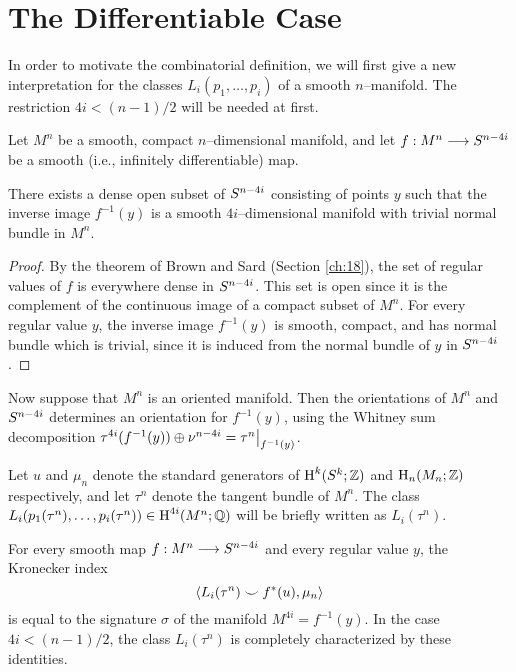 \documentclass[../main]{subfiles}
\begin{document}
\section{The Differentiable Case}
In order to motivate the combinatorial definition, we will first give a new interpretation for the classes $L_i(p_1, \ldots, p_i)$ of a smooth $n$--manifold. The restriction $4i < (n - 1)/2$ will be needed at first.

Let $M^n$ be a smooth, compact $n$--dimensional manifold, and let \newline $f : M^n \longrightarrow S^{n - 4i}$ be a smooth (i.e., infinitely differentiable) map. 

\begin{lemma}
There exists a dense open subset of $S^{n - 4i}$ consisting of points $y$ such that the inverse image $f^{-1}(y)$ is a smooth $4i$--dimensional manifold with trivial normal bundle in $M^n$. 
\end{lemma}

\begin{proof}
By the theorem of Brown and Sard (Section \ref{ch:18}), the set of regular values of $f$ is everywhere dense in $S^{n - 4i}$. This set is open since it is the complement of the continuous image of a compact subset of $M^n$. For every regular value $y$, the inverse image $f^{-1}(y)$ is smooth, compact, and has normal bundle which is trivial, since it is induced from the normal bundle of $y$ in $S^{n - 4i}$.  
\end{proof}

Now suppose that $M^n$ is an oriented manifold. Then the orientations of $M^n$ and $S^{n - 4i}$ determines an orientation for $f^{-1}(y)$, using the Whitney sum decomposition $\tau^{4i}(f^{-1}(y)) \oplus \nu^{n - 4i} = \tau^n \big{|}_{f^{-1}(y)}$.

Let $u$ and $\mu_n$ denote the standard generators of $\operatorname{H}^k(S^k; \mathbb Z)$ and $\operatorname{H}_n(M_n; \mathbb Z)$ respectively, and let $\tau^n$ denote the tangent bundle of $M^n$. The class \newline $L_i(p_1(\tau^n), \ldots, p_i(\tau^n)) \in \operatorname{H}^{4i}(M^n; \mathbb Q)$ will be briefly written as $L_i(\tau^n)$. 

\begin{lemma}
\label{lem:20.2}
For every smooth map $f : M^n \longrightarrow S^{n - 4i}$ and every regular value $y$, the Kronecker index \[\langle L_i(\tau^n) \smile f^\ast(u),\mu_n\rangle\] is equal to the signature $\sigma$ of the manifold $M^{4i} = f^{-1}(y)$. In the case \newline $4i < (n - 1)/2$, the class $L_i(\tau^n)$ is completely characterized by these identities. 
\end{lemma}
\end{document}
